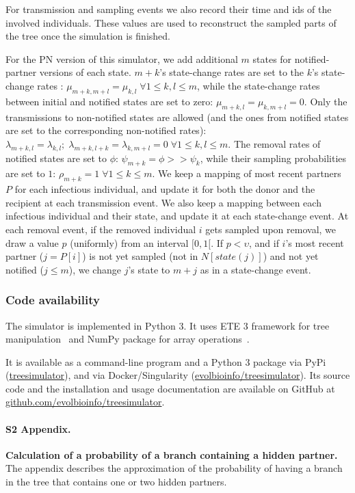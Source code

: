 \documentclass[10pt,letterpaper]{article}
\begin{document}
For transmission and sampling events we also record their time and ids of the involved individuals. These values are used to reconstruct the sampled parts of the tree once the simulation is finished.


For the PN version of this simulator, we add additional $m$ states for notified-partner versions of each state. $m + k$'s state-change rates are set to the $k$'s state-change rates : $\mu_{m+k,m+l} = \mu_{k,l}\; \forall 1 \leq  k,l \leq m$, while the state-change rates between initial and notified states are set to zero: $\mu_{m+k,l} = \mu_{k,m+l} = 0$. Only the transmissions to non-notified states are allowed (and the ones from notified states are set to the corresponding non-notified rates): $\lambda_{m+k,l} = \lambda_{k,l}; \;\lambda_{m+k,l+k} = \lambda_{k,m+l} =0 \; \forall 1 \leq  k,l \leq m$. The removal rates of notified states are set to $\phi$: $\psi_{m+k} = \phi >> \psi_k$, while their sampling probabilities are set to $1$: $\rho_{m+k} = 1 \; \forall 1 \leq  k \leq m$. We keep a mapping of most recent partners $P$ for each infectious individual, and update it for both the donor and the recipient at each transmission event. We also keep a mapping between each infectious individual and their state, and update it at each state-change event. At each removal event, if the removed individual $i$ gets sampled upon removal, we draw a value $p$ (uniformly) from an interval $[0, 1[$. If $p < \upsilon$, and if $i$'s most recent partner ($j = P[i]$) is not yet sampled (not in $N[state(j)]$) and not yet notified ($j \leq m$), we change $j$'s state to $m + j$ as in a state-change event.

\subsubsection*{Code availability}
The simulator is implemented in Python 3. It uses ETE 3 framework for tree manipulation~\cite{Huerta-Cepas2016} and NumPy package for array operations~\cite{harris_array_2020}. 

It is available as a command-line program and a Python 3 package via PyPi (\href{https://pypi.org/project/treesimulator}{treesimulator}), and via Docker/Singularity (\href{https://hub.docker.com/r/evolbioinfo/treesimulator/tags}{evolbioinfo/treesimulator}). Its source code and the installation and usage documentation are available on GitHub at \href{https://github.com/evolbioinfo/treesimulator}{github.com/evolbioinfo/treesimulator}.


\paragraph*{S2 Appendix.}
\label{S2_Appendix}
{\bf Calculation of a probability of a branch containing a hidden partner.} The appendix describes the approximation of the probability of having a branch in the tree that contains one or two hidden partners.
\end{document}

